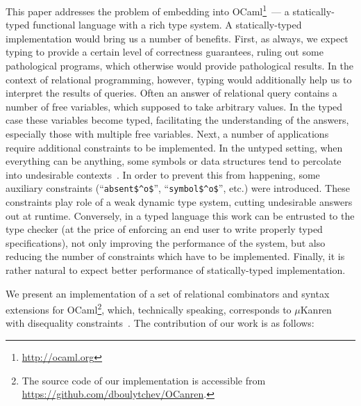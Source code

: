 This paper addresses the problem of embedding \miniKanren into OCaml\footnote{\url{http://ocaml.org}}~--- a statically-typed functional language with 
a rich type system. A statically-typed implementation would bring us a number of benefits. First, as always, 
we expect typing to provide a certain level of correctness guarantees, ruling out some pathological programs, which
otherwise would provide pathological results. In the context of relational programming, however, typing would additionally 
help us to interpret the results of queries. Often an answer of relational query contains a number of
free variables, which supposed to take arbitrary values. In the typed case these variables become typed,  
facilitating the understanding of the answers, especially those with multiple free variables. Next, a number of \miniKanren 
applications require additional constraints to be implemented. In the untyped setting, when everything can be anything, 
some symbols or data structures tend to percolate into undesirable contexts~\cite{Untagged}. In order to prevent this from happening, some 
auxiliary constraints (``\lstinline{absent$^o$}'', ``\lstinline{symbol$^o$}'', etc.) were introduced. These constraints play role of 
a weak dynamic type system, cutting undesirable answers out at runtime. Conversely, in a typed language this work can be
entrusted to the type checker (at the price of enforcing an end user to write properly typed specifications), not only improving the
performance of the system, but also reducing the number of constraints which have to be implemented. Finally, it is rather natural
to expect better performance of statically-typed implementation.

We present an implementation of a set of relational combinators and syntax extensions for 
OCaml\footnote{The source code of our implementation is accessible from \url{https://github.com/dboulytchev/OCanren}.}, 
which, technically speaking, corresponds to $\mu$Kanren~\cite{MicroKanren} with disequality 
constraints~\cite{CKanren}. The contribution of our work is as follows:

